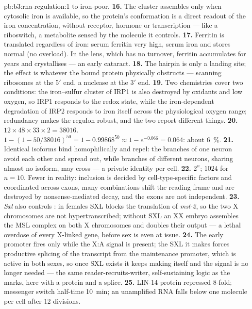 \begin{solution}{pb:b3:rna-regulation:1}
to iron-poor.
\textbf{16.} The cluster assembles only when cytosolic iron is available,
so the protein's conformation is a direct readout of the iron
concentration, without receptor, hormone or transcription --- like a
riboswitch, a metabolite sensed by the molecule it controls.
\textbf{17.} Ferritin is translated regardless of iron: serum ferritin
very high, serum iron and stores normal (no overload). In the lens,
which has no turnover, ferritin accumulates for years and crystallises
--- an early cataract.
\textbf{18.} The hairpin is only a landing site; the effect is whatever
the bound protein physically obstructs --- scanning ribosomes at the
5$'$ end, a nuclease at the 3$'$ end.
\textbf{19.} Two chemistries cover two conditions: the iron--sulfur
cluster of IRP1 is also destroyed by oxidants and low oxygen, so IRP1
responds to the redox state, while the iron-dependent degradation of
IRP2 responds to iron itself across the physiological oxygen range;
redundancy makes the regulon robust, and the two report different
things.
\textbf{20.} $12\times 48\times 33\times 2 = \num{38016}$. $1 - (1 -
50/\num{38016})^{50} = 1 - 0.99868^{50} \approx 1 - e^{-0.066} =
0.064$: about \qty{6}{\%}.
\textbf{21.} Identical isoforms bind homophilically and repel: the
branches of one neuron avoid each other and spread out, while branches
of different neurons, sharing almost no isoform, may cross --- a private
identity per cell.
\textbf{22.} $2^{n}$; $\num{1024}$ for $n = 10$. Fewer in reality:
inclusion is decided by cell-type-specific factors and coordinated
across exons, many combinations shift the reading frame and are
destroyed by nonsense-mediated decay, and the exons are not
independent.
\textbf{23.} \emph{Sxl} also controls : in females
SXL blocks the translation of \emph{msl-2}, so the two X chromosomes
are not hypertranscribed; without SXL an XX embryo assembles the MSL
complex on both X chromosomes and doubles their output --- a lethal
overdose of every X-linked gene, before sex is even at issue.
\textbf{24.} The early promoter fires only while the X:A signal is
present; the SXL it makes forces productive splicing of the transcript
from the maintenance promoter, which is active in both sexes, so once
SXL exists it keeps making itself and the signal is no longer needed
--- the same reader-recruits-writer, self-sustaining logic as the
 marks, here with a protein and a splice.
\textbf{25.} LIN-14 protein repressed $8$-fold; messenger switch
half-time \qty{10}{min}; an unamplified RNA falls below one molecule
per cell after $12$ divisions.
\end{solution}
